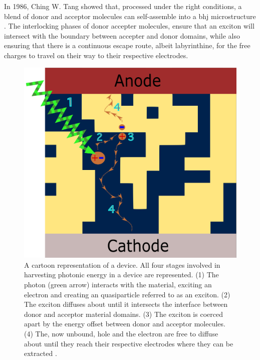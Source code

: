 In 1986, Ching W. Tang
showed that, processed under the right conditions, a blend of donor and acceptor molecules can self-assemble
into a \gls{bhj} microstructure \cite{Tang1986c}. 
The interlocking phases of donor accepter molecules, ensure
that an exciton will intersect with the boundary between accepter and donor domains, while also ensuring that
there
is a continuous escape route, albeit labyrinthine, for the free charges to travel on their way to their respective
electrodes. 

\begin{figure}
    \center
    \includegraphics[width = .6\textwidth]{figures/BHJ-figure.png}
    \caption{A cartoon representation of a  device. All four stages involved in harvesting
    photonic energy in a  device are represented. (1) The photon (green arrow) interacts with the material,
    exciting an electron and creating an quasiparticle referred to as an exciton. (2) The exciton diffuses
    about until it intersects the interface between donor and acceptor material domains. (3) The exciton is
    coerced apart by the energy offset between donor and acceptor molecules. 
    (4) The, now unbound,  hole and the electron are free to diffuse about until they reach their respective
    electrodes where they can be extracted \cite{Fusella2019}.}
    \label{bhj}
\end{figure}


